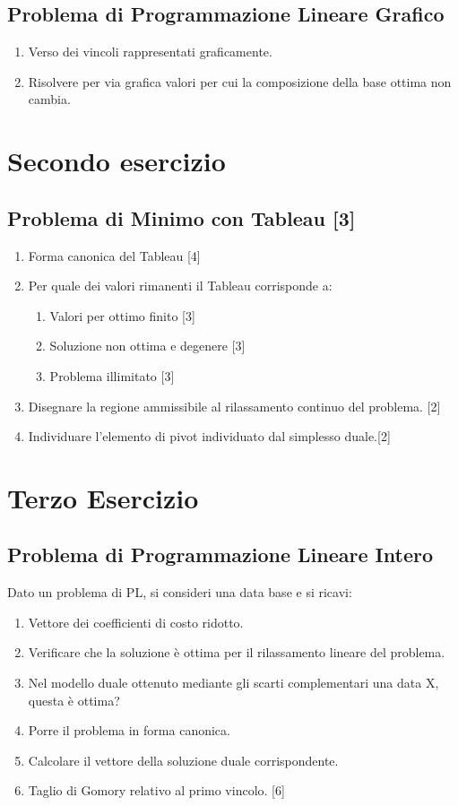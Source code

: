 \documentclass[\main/main.tex]{subfiles}
\begin{document}
\subsection{Problema di Programmazione Lineare Grafico}
\begin{enumerate}
  \item Verso dei vincoli rappresentati graficamente.
  \item Risolvere per via grafica valori per cui la composizione della base ottima non cambia.
\end{enumerate}


\section{Secondo esercizio}

\subsection{Problema di Minimo con Tableau [3]}

\begin{enumerate}
  \item Forma canonica del Tableau [4]
  \item Per quale dei valori rimanenti il Tableau corrisponde a:
        \begin{enumerate}
          \item Valori per ottimo finito [3]
          \item Soluzione non ottima e degenere [3]
          \item Problema illimitato [3]
        \end{enumerate}
  \item Disegnare la regione ammissibile al rilassamento continuo del problema. [2]
  \item Individuare l'elemento di pivot individuato dal simplesso duale.[2]
\end{enumerate}

\section{Terzo Esercizio}

\subsection{Problema di Programmazione Lineare Intero}
Dato un problema di PL, si consideri una data base e si ricavi:

\begin{enumerate}
  \item Vettore dei coefficienti di costo ridotto.
  \item Verificare che la soluzione è ottima per il rilassamento lineare del problema.
  \item Nel modello duale ottenuto mediante gli scarti complementari una data X, questa è ottima?
  \item Porre il problema in forma canonica.
  \item Calcolare il vettore della soluzione duale corrispondente.
  \item Taglio di Gomory relativo al primo vincolo. [6]
\end{enumerate}
\end{document}
